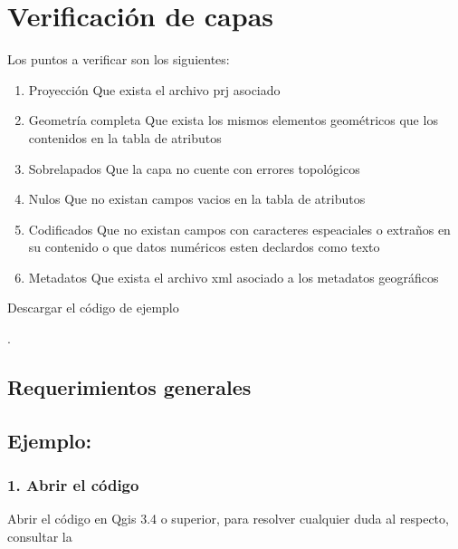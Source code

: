 \documentclass[letterpaper,10pt,spanish]{sphinxmanual}
\begin{document}
\chapter{Verificación de capas}
\label{\detokenize{verificacion:verificacion-de-capas}}\label{\detokenize{verificacion::doc}}
Los puntos a verificar son los siguientes:
\begin{enumerate}
\def\theenumi{\arabic{enumi}}
\def\labelenumi{\theenumi .}
\makeatletter\def\p@enumii{\p@enumi \theenumi .}\makeatother
\item {} 
Proyección Que exista el archivo prj asociado

\item {} 
Geometría completa  Que exista los mismos elementos geométricos que los contenidos en la tabla de atributos

\item {} 
Sobrelapados Que la capa no cuente con errores topológicos

\item {} 
Nulos Que no existan campos vacios en la tabla de atributos

\item {} 
Codificados Que no existan campos con caracteres espeaciales o extraños en su contenido o que datos numéricos esten declardos como texto

\item {} 
Metadatos Que exista el archivo xml asociado a los metadatos geográficos

\end{enumerate}

Descargar el código de ejemplo

.


\section{Requerimientos generales}
\label{\detokenize{verificacion:requerimientos-generales}}

\section{Ejemplo:}
\label{\detokenize{verificacion:ejemplo}}

\subsection{1. Abrir el código}
\label{\detokenize{verificacion:abrir-el-codigo}}
Abrir el código  en Qgis 3.4 o superior,
para resolver cualquier duda al respecto, consultar la 
\end{document}
